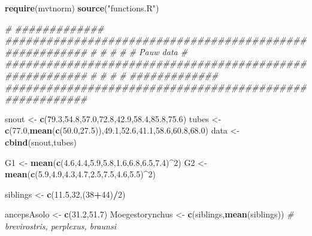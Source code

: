 \documentclass[]{article}
\newenvironment{Shaded}{\begin{snugshade}}{\end{snugshade}}
\newcommand{\CommentTok}[1]{\textcolor[rgb]{0.56,0.35,0.01}{\textit{#1}}}
\newcommand{\DecValTok}[1]{\textcolor[rgb]{0.00,0.00,0.81}{#1}}
\newcommand{\FloatTok}[1]{\textcolor[rgb]{0.00,0.00,0.81}{#1}}
\newcommand{\KeywordTok}[1]{\textcolor[rgb]{0.13,0.29,0.53}{\textbf{#1}}}
\newcommand{\NormalTok}[1]{#1}
\newcommand{\OperatorTok}[1]{\textcolor[rgb]{0.81,0.36,0.00}{\textbf{#1}}}
\newcommand{\StringTok}[1]{\textcolor[rgb]{0.31,0.60,0.02}{#1}}
\begin{document}
\begin{Shaded}
\begin{Highlighting}[]
\KeywordTok{require}\NormalTok{(mvtnorm)}
\KeywordTok{source}\NormalTok{(}\StringTok{"functions.R"}\NormalTok{)}

\CommentTok{#      #############      ########################################################}
\CommentTok{#      #           #}
\CommentTok{#      # Pauw data #      ########################################################}
\CommentTok{#      #           #}
\CommentTok{#      #############      ########################################################}

\NormalTok{snout <-}\StringTok{ }\KeywordTok{c}\NormalTok{(}\FloatTok{79.3}\NormalTok{,}\FloatTok{54.8}\NormalTok{,}\FloatTok{57.0}\NormalTok{,}\FloatTok{72.8}\NormalTok{,}\FloatTok{42.9}\NormalTok{,}\FloatTok{58.4}\NormalTok{,}\FloatTok{85.8}\NormalTok{,}\FloatTok{75.6}\NormalTok{)}
\NormalTok{tubes <-}\StringTok{ }\KeywordTok{c}\NormalTok{(}\FloatTok{77.0}\NormalTok{,}\KeywordTok{mean}\NormalTok{(}\KeywordTok{c}\NormalTok{(}\FloatTok{50.0}\NormalTok{,}\FloatTok{27.5}\NormalTok{)),}\FloatTok{49.1}\NormalTok{,}\FloatTok{52.6}\NormalTok{,}\FloatTok{41.1}\NormalTok{,}\FloatTok{58.6}\NormalTok{,}\FloatTok{60.8}\NormalTok{,}\FloatTok{68.0}\NormalTok{)}
\NormalTok{data <-}\StringTok{ }\KeywordTok{cbind}\NormalTok{(snout,tubes)}

\NormalTok{G1 <-}\StringTok{ }\KeywordTok{mean}\NormalTok{(}\KeywordTok{c}\NormalTok{(}\FloatTok{4.6}\NormalTok{,}\FloatTok{4.4}\NormalTok{,}\FloatTok{5.9}\NormalTok{,}\FloatTok{5.8}\NormalTok{,}\FloatTok{1.6}\NormalTok{,}\FloatTok{6.8}\NormalTok{,}\FloatTok{6.5}\NormalTok{,}\FloatTok{7.4}\NormalTok{)}\OperatorTok{^}\DecValTok{2}\NormalTok{)}
\NormalTok{G2 <-}\StringTok{ }\KeywordTok{mean}\NormalTok{(}\KeywordTok{c}\NormalTok{(}\FloatTok{5.9}\NormalTok{,}\FloatTok{4.9}\NormalTok{,}\FloatTok{4.3}\NormalTok{,}\FloatTok{4.7}\NormalTok{,}\FloatTok{2.5}\NormalTok{,}\FloatTok{7.5}\NormalTok{,}\FloatTok{4.6}\NormalTok{,}\FloatTok{5.5}\NormalTok{)}\OperatorTok{^}\DecValTok{2}\NormalTok{)}

\NormalTok{siblings <-}\StringTok{ }\KeywordTok{c}\NormalTok{(}\FloatTok{11.5}\NormalTok{,}\DecValTok{32}\NormalTok{,(}\DecValTok{38}\OperatorTok{+}\DecValTok{44}\NormalTok{)}\OperatorTok{/}\DecValTok{2}\NormalTok{)}

\NormalTok{ancepsAsolo <-}\StringTok{ }\KeywordTok{c}\NormalTok{(}\FloatTok{31.2}\NormalTok{,}\FloatTok{51.7}\NormalTok{)}
\NormalTok{Moegestorynchus <-}\StringTok{ }\KeywordTok{c}\NormalTok{(siblings,}\KeywordTok{mean}\NormalTok{(siblings)) }\CommentTok{# brevirostris, perplexus, braunsi}


\end{Highlighting}
\end{Shaded}
\end{document}

